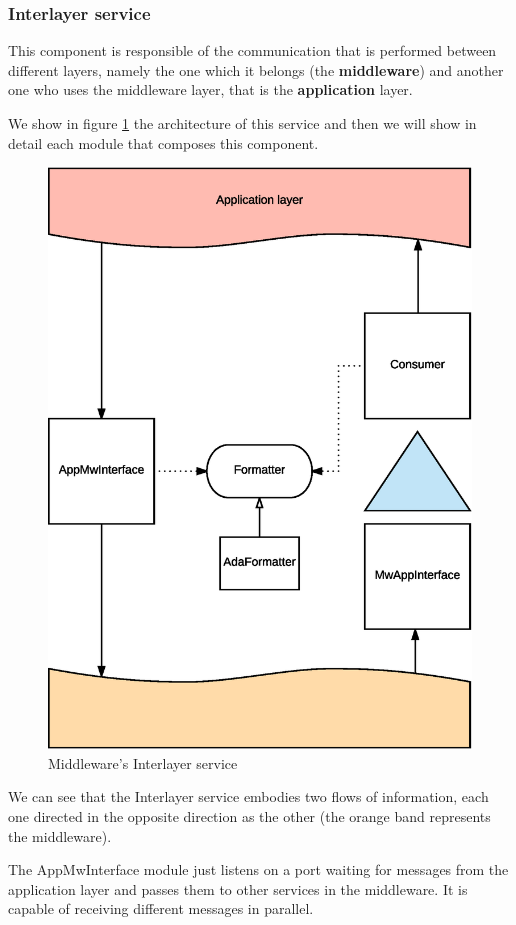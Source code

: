 \subsubsection{Interlayer service}

This component is responsible of the communication that is performed between
different layers, namely the one which it belongs (the \textbf{middleware}) and
another one who uses the middleware layer, that is the \textbf{application}
layer.

We show in figure \ref{fig:mw-interlayer} the architecture of this service and
then we will show in detail each module that composes this component.

\begin{figure}[H]
  \centering
  \includegraphics[width=.8\columnwidth]{images/solution/mw/int/architect.eps}
  \caption{Middleware's Interlayer service}
  \label{fig:mw-interlayer}
\end{figure}

We can see that the Interlayer service embodies two flows of information, each
one directed in the opposite direction as the other (the orange band represents
the middleware).

The AppMwInterface module just listens on a port waiting for messages from
the application layer and passes them to other services in the middleware.
It is capable of receiving different messages in parallel.

